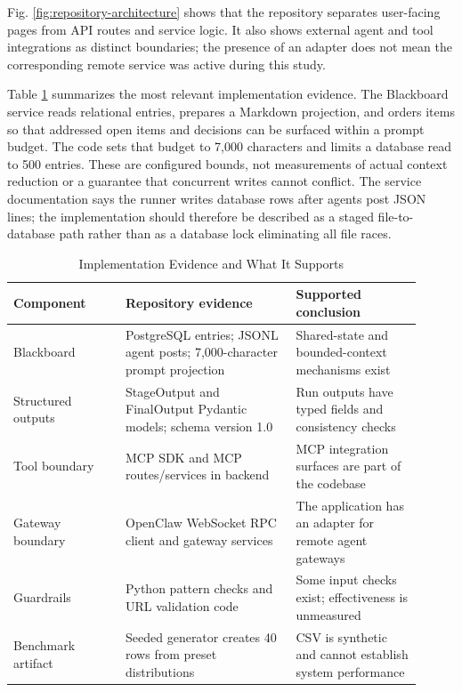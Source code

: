 \documentclass[12pt,onecolumn,draftclsnofoot]{IEEEtran}
\begin{document}
Fig. \ref{fig:repository-architecture} shows that the repository separates user-facing pages from API routes and service logic. It also shows external agent and tool integrations as distinct boundaries; the presence of an adapter does not mean the corresponding remote service was active during this study.

Table \ref{tab:implementation-evidence} summarizes the most relevant implementation evidence. The Blackboard service reads relational entries, prepares a Markdown projection, and orders items so that addressed open items and decisions can be surfaced within a prompt budget. The code sets that budget to 7,000 characters and limits a database read to 500 entries. These are configured bounds, not measurements of actual context reduction or a guarantee that concurrent writes cannot conflict. The service documentation says the runner writes database rows after agents post JSON lines; the implementation should therefore be described as a staged file-to-database path rather than as a database lock eliminating all file races.

\begin{table}[t]
\centering
\caption{Implementation Evidence and What It Supports}
\label{tab:implementation-evidence}
\small
\begin{tabular}{@{}p{0.25\linewidth}p{0.38\linewidth}p{0.28\linewidth}@{}}
\toprule
\textbf{Component} & \textbf{Repository evidence} & \textbf{Supported conclusion} \\
\midrule
Blackboard & PostgreSQL entries; JSONL agent posts; 7,000-character prompt projection & Shared-state and bounded-context mechanisms exist \\
Structured outputs & StageOutput and FinalOutput Pydantic models; schema version 1.0 & Run outputs have typed fields and consistency checks \\
Tool boundary & MCP SDK and MCP routes/services in backend & MCP integration surfaces are part of the codebase \\
Gateway boundary & OpenClaw WebSocket RPC client and gateway services & The application has an adapter for remote agent gateways \\
Guardrails & Python pattern checks and URL validation code & Some input checks exist; effectiveness is unmeasured \\
Benchmark artifact & Seeded generator creates 40 rows from preset distributions & CSV is synthetic and cannot establish system performance \\
\bottomrule
\end{tabular}
\end{table}
\end{document}
